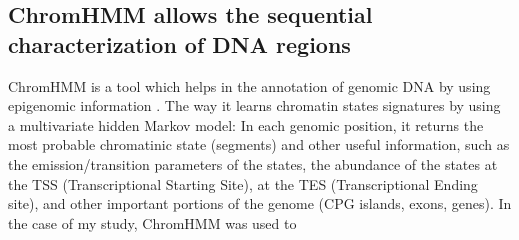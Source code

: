 \subsection{ChromHMM allows the sequential characterization of DNA regions}
ChromHMM is a tool which helps in the annotation of genomic DNA by using epigenomic information
\cite{ernstChromatinstateDiscoveryGenome2017}
. The way it learns chromatin states signatures by using a multivariate hidden Markov model: In each genomic position, it returns the most probable chromatinic state (segments) and other useful information, such as the emission/transition parameters of the states, the abundance of the states at the TSS (Transcriptional Starting Site), at the TES (Transcriptional Ending site), and other important portions of the genome (CPG islands, exons, genes). In the case of my study, ChromHMM was used to